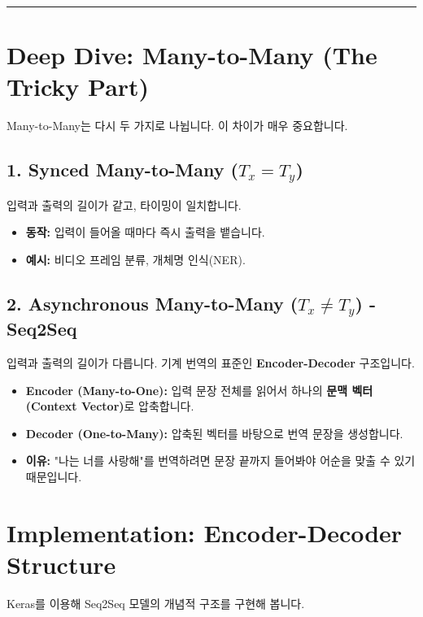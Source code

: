 \documentclass[11pt,a4paper]{book}
\theoremstyle{definition}
\begin{document}
\vspace{0.5cm}\hrule\vspace{0.5cm}

\section{Deep Dive: Many-to-Many (The Tricky Part)}

Many-to-Many는 다시 두 가지로 나뉩니다. 이 차이가 매우 중요합니다.

\subsection{1. Synced Many-to-Many ($T_x = T_y$)}

입력과 출력의 길이가 같고, 타이밍이 일치합니다.
\begin{itemize}
    \item \textbf{동작:} 입력이 들어올 때마다 즉시 출력을 뱉습니다.
    \item \textbf{예시:} 비디오 프레임 분류, 개체명 인식(NER).
\end{itemize}

\subsection{2. Asynchronous Many-to-Many ($T_x \neq T_y$) - Seq2Seq}

입력과 출력의 길이가 다릅니다. 기계 번역의 표준인 \textbf{Encoder-Decoder} 구조입니다.
\begin{itemize}
    \item \textbf{Encoder (Many-to-One):} 입력 문장 전체를 읽어서 하나의 \textbf{문맥 벡터(Context Vector)}로 압축합니다.
    \item \textbf{Decoder (One-to-Many):} 압축된 벡터를 바탕으로 번역 문장을 생성합니다.
    \item \textbf{이유:} "나는 너를 사랑해"를 번역하려면 문장 끝까지 들어봐야 어순을 맞출 수 있기 때문입니다.
\end{itemize}

\section{Implementation: Encoder-Decoder Structure}

Keras를 이용해 Seq2Seq 모델의 개념적 구조를 구현해 봅니다.
\end{document}
